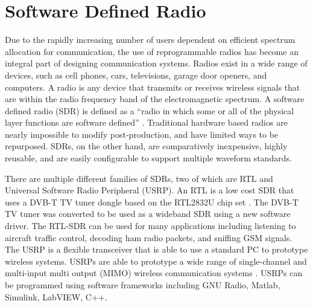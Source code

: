 \section{Software Defined Radio}
Due to the rapidly increasing number of users dependent on efficient spectrum allocation for communication, the use of reprogrammable radios has become an integral part of designing communication systems. Radios exist in a wide range of devices, such as cell phones, cars, televisions, garage door openers, and computers. A radio is any device that transmits or receives wireless signals that are within the radio frequency band of the electromagnetic spectrum. A software defined radio (SDR) is defined as a “radio in which some or all of the physical layer functions are software defined” \cite{sdr_forum}. Traditional hardware based radios are nearly impossible to modify post-production, and have limited ways to be repurposed. SDRs, on the other hand, are comparatively inexpensive, highly reusable, and are easily configurable to support multiple waveform standards.\par
There are multiple different families of SDRs, two of which are RTL and Universal Software Radio Peripheral (USRP). An RTL is a low cost SDR that uses a DVB-T TV tuner dongle based on the RTL2832U chip set \cite{rtl_sdr}. The DVB-T TV tuner was converted to be used as a wideband SDR using a new software driver. The RTL-SDR can be used for many applications including listening to aircraft traffic control, decoding ham radio packets, and sniffing GSM signals. The USRP is a flexible transceiver that is able to use a standard PC to prototype wireless systems. USRPs are able to prototype a wide range of single-channel and multi-input multi output (MIMO) wireless communication systems \cite{USRP_NI}. USRPs can be programmed using software frameworks including GNU Radio, Matlab, Simulink, LabVIEW, C++.\par
